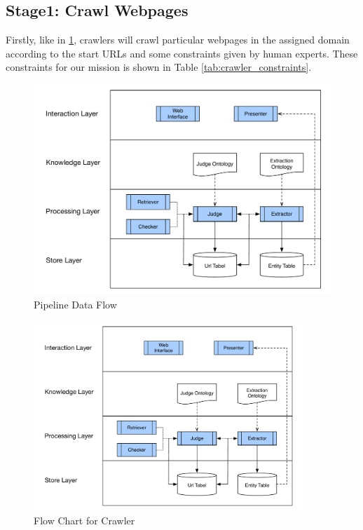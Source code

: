 \subsection{Stage1: Crawl Webpages}
Firstly, like in \ref{fig:sys:data_flow}, crawlers will crawl particular webpages in the assigned domain according to the start URLs and some constraints given by human experts. These constraints for our mission is shown in Table \ref{tab:crawler_constraints}.
\begin{figure}[htb!]
	\centering
	\includegraphics[page=3,width=\textwidth]{images/diagrams.pdf}
	\caption{Pipeline Data Flow}\label{fig:sys:data_flow}
\end{figure}

\begin{figure}[htb!]
	\centering
	\includegraphics[page=5,width=0.9\textwidth]{images/diagrams.pdf}
	\caption{Flow Chart for Crawler}\label{fig:fc:crawler}
\end{figure}

